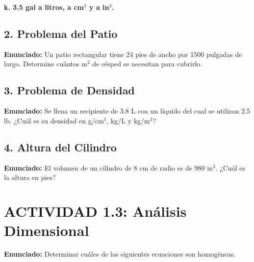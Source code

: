 \documentclass[12pt, letterpaper]{article}
\begin{document}
	\noindent \textbf{k. 3.5 gal a litros, a cm$^3$ y a in$^3$.}
	
	\subsection*{2. Problema del Patio}
	\noindent \textbf{Enunciado:} Un patio rectangular tiene 24 pies de ancho por 1500 pulgadas de largo. Determine cuántos m$^2$ de césped se necesitan para cubrirlo.
	
	\subsection*{3. Problema de Densidad}
	\noindent \textbf{Enunciado:} Se llena un recipiente de 3.8 L con un líquido del cual se utilizan 2.5 lb. ¿Cuál es su densidad en g/cm$^3$, kg/L y kg/m$^3$?
	
	\subsection*{4. Altura del Cilindro}
	\noindent \textbf{Enunciado:} El volumen de un cilindro de 8 cm de radio es de 980 in$^3$. ¿Cuál es la altura en pies?
	
	\section*{ACTIVIDAD 1.3: Análisis Dimensional}
	\noindent \textbf{Enunciado:} Determinar cuáles de las siguientes ecuaciones son homogéneas.
	
\end{document}

